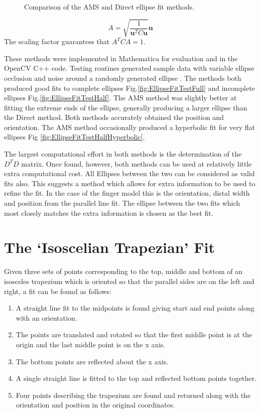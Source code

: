 \begin{figure}[p]
{\label{fig:EllipseFitTestHalf}}
\caption{Comparison of the AMS and Direct ellipse fit methods.}
\label{fig:EllipseFitTest}
\end{figure}

\begin{equation*}
 A = \sqrt{\frac{1}{\mathbf{u}^T C \mathbf{u}}}  \mathbf{u}
\end{equation*}
The scaling factor guarantees that  $A^T C A =1$.

These methods were implemented in Mathematica for evaluation and in the OpenCV C++ code. Testing routines generated sample data with variable ellipse occlusion and noise around a randomly generated ellipse . The methods both produced good fits to complete ellipses Fig.\ref{fig:EllipseFitTestFull} and incomplete ellipses Fig.\ref{fig:EllipseFitTestHalf}. The AMS method was slightly better at fitting the extreme ends of the ellipse, generally producing a larger ellipse than the Direct method. Both methods accurately obtained the position and orientation. The AMS method occasionally produced a hyperbolic fit for very flat ellipses Fig \ref{fig:EllipseFitTestHalfHyperbolic}.


The largest computational effort in both methods is the determination of the $D^T D$ matrix. Once found, however, both methods can be used at relatively little extra computational cost. All Ellipses between the two can be considered as valid fits also. This suggests a method which allows for extra information to be used to refine the fit. In the case of the finger model this is the orientation, distal width and position from the parallel line fit. The ellipse between the two fits which most closely matches the extra information is chosen as the best fit.
\clearpage

\section{The `Isoscelian Trapezian' Fit}\label{sec:TrapezianFit}

Given three sets of points corresponding to the top, middle and bottom of an isosceles trapezium which is oriented so that the parallel sides are on the left and right, a fit can be found as follows:

\begin{enumerate}
\item A straight line fit to the midpoints is found giving start and end points along with an orientation.
\item The points are translated and rotated so that the first middle point is at the origin and the last middle point is on the x axis.
\item The bottom points are reflected about the x axis.
\item A single straight line is fitted to the top and reflected bottom points together.
\item Four points describing the trapezium are found and returned along with the orientation and position in the original coordinates.
\end{enumerate}

